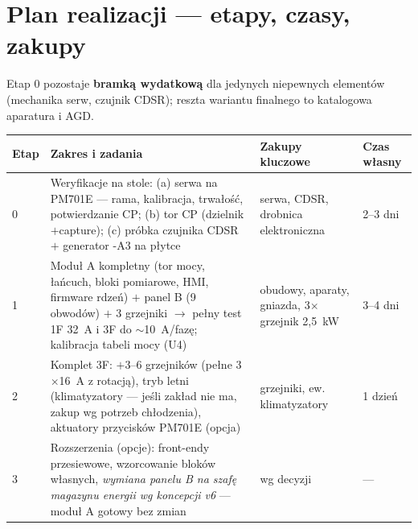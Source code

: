 \documentclass[11pt,a4paper]{article}
\begin{document}
\section{Plan realizacji --- etapy, czasy, zakupy}
Etap 0 pozostaje \textbf{bramką wydatkową} dla jedynych niepewnych elementów (mechanika serw,
czujnik CDSR); reszta wariantu finalnego to katalogowa aparatura i AGD.
\begin{longtable}{@{}p{}p{}p{}p{}@{}}
\toprule
\textbf{Etap} & \textbf{Zakres i zadania} & \textbf{Zakupy kluczowe} & \textbf{Czas własny}\\
\midrule
0 & Weryfikacje na stole: (a) serwa na PM701E --- rama, kalibracja, trwałość, potwierdzanie CP;
(b) tor CP (dzielnik$+$capture); (c) próbka czujnika CDSR $+$ generator -A3 na płytce &
serwa, CDSR, drobnica elektroniczna & 2--3 dni\\
1 & Moduł A kompletny (tor mocy, łańcuch, bloki pomiarowe, HMI, firmware rdzeń) $+$ panel B
(9 obwodów) $+$ 3 grzejniki $\to$ pełny test 1F 32~A i 3F do $\sim$10~A/fazę; kalibracja tabeli
mocy (U4) & obudowy, aparaty, gniazda, 3$\times$grzejnik 2,5~kW & 3--4 dni\\
2 & Komplet 3F: $+$3--6 grzejników (pełne 3$\times$16~A z rotacją), tryb letni (klimatyzatory
--- jeśli zakład nie ma, zakup wg potrzeb chłodzenia), aktuatory przycisków PM701E (opcja) &
grzejniki, ew. klimatyzatory & 1 dzień\\
3 & Rozszerzenia (opcje): front-endy przesiewowe, wzorcowanie bloków własnych, \emph{wymiana
panelu B na szafę magazynu energii wg koncepcji v6} --- moduł A gotowy bez zmian & wg decyzji & ---\\
\bottomrule
\end{longtable}
\end{document}
